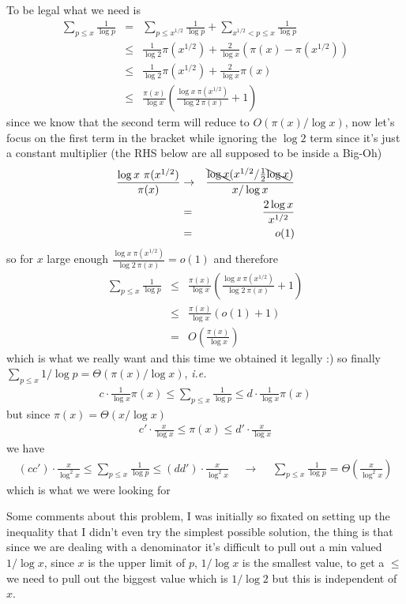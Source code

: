 \documentclass[aps,preprint,preprintnumbers,nofootinbib,showpacs,prd]{revtex4-1}
\newcommand{\ie}{{\it i.e.} }
\newcommand{\nbea}{\begin{eqnarray*}}
\newcommand{\neea}{\end{eqnarray*}}
\begin{document}
To be legal what we need is
%
\nbea
\sum_{p \le x} \frac{1} {\log p} & = & \sum_{p \le x^{1/2}} \frac{1} {\log p} + \sum_{x^{1/2} < p \le x} \frac{1} {\log p} \\
& \le & \frac{1}{\log 2} \pi(x^{1/2}) + \frac{2} {\log x} (\pi(x) - \pi(x^{1/2})) \\
& \le & \frac{1}{\log 2} \pi(x^{1/2}) + \frac{2} {\log x} \pi(x) \\
& \le & \frac{\pi(x)}{\log x} \left ( \frac{\log x ~ \pi(x^{1/2})}{\log 2 ~ \pi(x)}  + 1\right )
\neea
%
since we know that the second term will reduce to $O(\pi(x)/\log x)$, now let's focus on the first term in the bracket while ignoring the $\log 2$ term since it's just a constant multiplier (the RHS below are all supposed to be inside a Big-Oh)
%
\nbea
\frac{\log x ~ \pi(x^{1/2})}{\pi(x)} & \to & \frac{\bcancel{\log x} (x^{1/2}/\frac{1}{2}\bcancel{\log x})}{x/\log x} \\
& = & \frac{2 \log x}{x^{1/2}} \\
& = & o(1)
\neea
%
so for $x$ large enough $\frac{\log x ~ \pi(x^{1/2})}{\log 2 ~ \pi(x)} = o(1)$ and therefore
%
\nbea
\sum_{p \le x} \frac{1} {\log p} & \le & \frac{\pi(x)}{\log x} \left ( \frac{\log x ~ \pi(x^{1/2})}{\log 2 ~ \pi(x)}  + 1\right ) \\
& \le & \frac{\pi(x)}{\log x} \left ( o(1)  + 1\right ) \\
& = & O\left(\frac{\pi(x)}{\log x}\right)
\neea
%
which is what we really want and this time we obtained it legally :) so finally $\sum_{p \le x} 1/\log p = \Theta(\pi(x)/\log x)$, \ie
%
\nbea
c\cdot\frac{1}{\log x} \pi(x) \le \sum_{p \le x} \frac{1} {\log p} \le d\cdot\frac{1}{\log x} \pi(x)
\neea
%
but since $\pi(x) = \Theta(x/\log x)$
%
\nbea
c'\cdot\frac{x}{\log x} \le \pi(x) \le d'\cdot\frac{x}{\log x}
\neea
%
we have
%
\nbea
(cc')\cdot\frac{x}{\log^2 x} \le \sum_{p \le x} \frac{1} {\log p} \le (dd')\cdot\frac{x}{\log^2 x} &~~~\longrightarrow~~~& \sum_{p \le x} \frac{1}{\log p} = \Theta\left(\frac{x}{\log^2 x}\right)
\neea
%
which is what we were looking for

Some comments about this problem, I was initially so fixated on setting up the inequality that I didn't even try the simplest possible solution, the thing is that since we are dealing with a denominator it's difficult to pull out a min valued $1/\log x$, since $x$ is the upper limit of $p$, $1/\log x$ is the smallest value, to get a $\le$ we need to pull out the biggest value which is $1/\log 2$ but this is independent of $x$.
\end{document}
